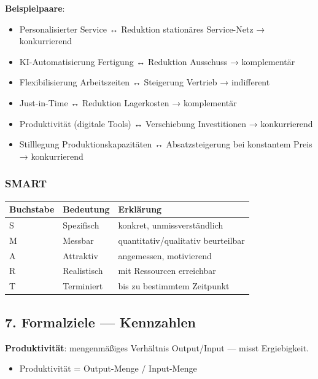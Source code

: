 \documentclass[11pt, a4paper]{article}
\begin{document}
\textbf{Beispielpaare}:

\begin{itemize}
  \item Personalisierter Service ↔ Reduktion stationäres Service-Netz → konkurrierend
  \item KI-Automatisierung Fertigung ↔ Reduktion Ausschuss → komplementär
  \item Flexibilisierung Arbeitszeiten ↔ Steigerung Vertrieb → indifferent
  \item Just-in-Time ↔ Reduktion Lagerkosten → komplementär
  \item Produktivität (digitale Tools) ↔ Verschiebung Investitionen → konkurrierend
  \item Stilllegung Produktionskapazitäten ↔ Absatzsteigerung bei konstantem Preis → konkurrierend
\end{itemize}


\subsubsection{SMART}


{\small
\begin{tabularx}{\linewidth}{XXX}
\hline
\rowcolor{tableheadbg}
{\color{white}\textbf{Buchstabe}} & {\color{white}\textbf{Bedeutung}} & {\color{white}\textbf{Erklärung}} \\[2pt]
\hline
\endhead
\hline
\endfoot
S & Spezifisch & konkret, unmissverständlich \\
M & Messbar & quantitativ/qualitativ beurteilbar \\
A & Attraktiv & angemessen, motivierend \\
R & Realistisch & mit Ressourcen erreichbar \\
T & Terminiert & bis zu bestimmtem Zeitpunkt \\
\end{tabularx}
}



\subsection{7. Formalziele — Kennzahlen}

\textbf{Produktivität}: mengenmäßiges Verhältnis Output/Input — misst Ergiebigkeit.

\begin{itemize}
  \item Produktivität = Output-Menge / Input-Menge
\end{itemize}
\end{document}

